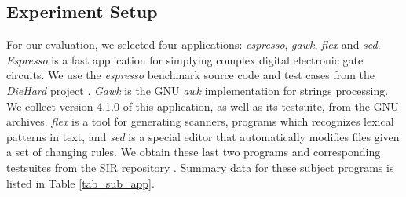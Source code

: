 \subsection{Experiment Setup}


\begin{table}[tbp]
\centering
\caption{Subject applications}
\label{tab_sub_app}
\end{table}

For our evaluation, we selected four applications: \emph{espresso}, \emph{gawk}, \emph{flex} and \emph{sed}. \emph{Espresso} is a fast application for simplying complex digital electronic gate circuits. We use the \emph{espresso} benchmark source code and test cases from the \emph{DieHard} project \cite{Berger:2006:DPM:1133981.1134000}. \emph{Gawk} is the GNU \emph{awk} implementation for strings processing. We collect version 4.1.0 of this application, as well as its testsuite, from the GNU archives. \emph{flex} is a tool for generating scanners, programs which recognizes lexical patterns in text, and \emph{sed} is a special editor that automatically modifies files given a set of changing rules. We obtain these last two programs and corresponding testsuites from the SIR repository \cite{SIR2005}. Summary data for these subject programs is listed in Table \ref{tab_sub_app}.
%


